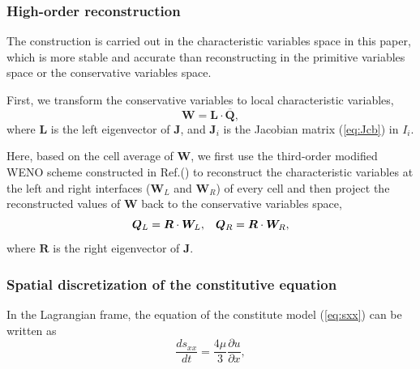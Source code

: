 \documentclass{article}
\numberwithin{equation}{section}
\numberwithin{table}{section}
\begin{document}
\subsubsection{High-order reconstruction}
The construction is carried out in the characteristic variables  space in this paper, which is   more stable  and accurate  than reconstructing in the primitive variables space or the conservative variables space.

First, we transform the conservative variables to local characteristic variables,
\begin{equation}\label{eq:chaVar}
  \bm{W} = \bm{L} \cdot \overline{\bm{Q}},
\end{equation}
where $\bm{L}$ is the left eigenvector of $\bm{J}$, and $\bm{J}_i$ is the Jacobian matrix  (\ref{eq:Jcb}) in $I_i$.

Here, based on the cell average of $\mathbf{W}$, we  first use the third-order modified WENO scheme constructed in Ref.(\cite{liu2018novel}) to reconstruct the characteristic variables at the  left and right interfaces ($\bm{W}_L$ and $\bm{W}_R$)  of every cell and then project the reconstructed values of $\mathbf{W}$ back to the conservative variables space,
\begin{equation}
  \bm{Q}_L = \bm{R} \cdot \bm{W}_L, \hspace{0.3cm}   \bm{Q}_R = \bm{R} \cdot \bm{W}_R,
\end{equation}
where $\bm{R}$ is the right eigenvector of $\bm{J}$.

\subsubsection{Spatial discretization of the constitutive equation}
In the Lagrangian frame, the equation of the constitute model (\ref{eq:sxx}) can be written as
\begin{equation}
  \frac{ds_{xx}}{dt} = \frac{4\mu }{3} \frac{\partial u}{\partial x},
\end{equation}
\end{document}
